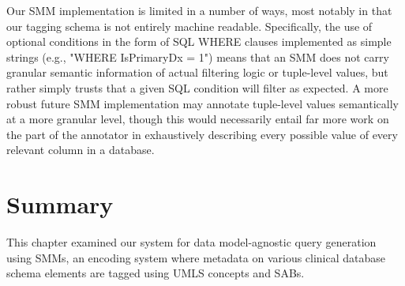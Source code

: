 \documentclass[../main.tex]{subfiles}
\begin{document}
Our SMM implementation is limited in a number of ways, most notably in that our tagging schema is not entirely machine readable. Specifically, the use of optional conditions in the form of SQL WHERE clauses implemented as simple strings (e.g., "WHERE IsPrimaryDx = 1") means that an SMM does not carry granular semantic information of actual filtering logic or tuple-level values, but rather simply trusts that a given SQL condition will filter as expected. A more robust future SMM implementation may annotate tuple-level values semantically at a more granular level, though this would necessarily entail far more work on the part of the annotator in exhaustively describing every possible value of every relevant column in a database.

\section{Summary}

This chapter examined our system for data model-agnostic query generation using SMMs, an encoding system where metadata on various clinical database schema elements are tagged using UMLS concepts and SABs. 
\end{document}
